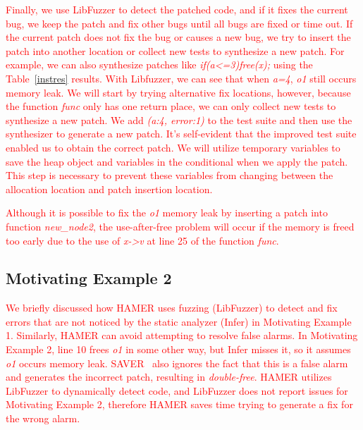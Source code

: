 \documentclass[a4j,dvipdfmx]{article}
\begin{document}
\textcolor{red}{
Finally, we use LibFuzzer to detect the patched code, and if it fixes the current bug, we keep the patch and fix other bugs until all bugs are fixed or time out. If the current patch does not fix the bug or causes a new bug, we try to insert the patch into another location or collect new tests to synthesize a new patch. For example, we can also synthesize patches like {\it if(a<=3)free(x);} using the Table~\ref{instres} results. With Libfuzzer, we can see that when {\it a=4}, {\it o1} still occurs memory leak. We will start by trying alternative fix locations, however, because the function {\it func} only has one return place, we can only collect new tests to synthesize a new patch. We add {\it (a:4, error:1)} to the test suite and then use the synthesizer to generate a new patch. It's self-evident that the improved test suite enabled us to obtain the correct patch. We will utilize temporary variables to save the heap object and variables in the conditional when we apply the patch. This step is necessary to prevent these variables from changing between the allocation location and patch insertion location.
}

\textcolor{red}{
Although it is possible to fix the  {\it o1} memory leak by inserting a patch into function  {\it new\_node2}, the use-after-free problem will occur if the memory is freed too early due to the use of  {\it x->v} at line 25 of the function  {\it func}.
}



\subsection{Motivating Example 2}
\textcolor{red}{
We briefly discussed how HAMER uses fuzzing (LibFuzzer) to detect and fix errors that are not noticed by the static analyzer (Infer) in Motivating Example 1. Similarly, HAMER can avoid attempting to resolve false alarms. In Motivating Example 2, line 10 frees {\it o1} in some other way, but Infer misses it, so it assumes {\it o1} occurs memory leak. SAVER~\cite{SAVER} also ignores the fact that this is a false alarm and generates the incorrect patch, resulting in {\it double-free}. HAMER utilizes LibFuzzer to dynamically detect code, and LibFuzzer does not report issues for Motivating Example 2, therefore HAMER saves time trying to generate a fix for the wrong alarm.
}
\end{document}

